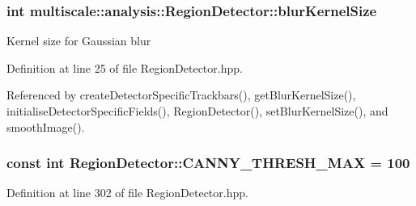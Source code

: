 \hypertarget{classmultiscale_1_1analysis_1_1RegionDetector_aae6ee0ec7f0a610dd8a906c1eb181bc7}{
\subsubsection[{blur\-Kernel\-Size}]{\setlength{\rightskip}{0pt plus 5cm}int {\bf multiscale\-::analysis\-::\-Region\-Detector\-::blur\-Kernel\-Size}}}\label{classmultiscale_1_1analysis_1_1RegionDetector_aae6ee0ec7f0a610dd8a906c1eb181bc7}
\-Kernel size for \-Gaussian blur 

\-Definition at line 25 of file \-Region\-Detector.\-hpp.



\-Referenced by create\-Detector\-Specific\-Trackbars(), get\-Blur\-Kernel\-Size(), initialise\-Detector\-Specific\-Fields(), \-Region\-Detector(), set\-Blur\-Kernel\-Size(), and smooth\-Image().

\hypertarget{classmultiscale_1_1analysis_1_1RegionDetector_ad6590f4617a6b3d34c6032f8febd7beb}{
\subsubsection[{\-C\-A\-N\-N\-Y\-\_\-\-T\-H\-R\-E\-S\-H\-\_\-\-M\-A\-X}]{\setlength{\rightskip}{0pt plus 5cm}const int {\bf \-Region\-Detector\-::\-C\-A\-N\-N\-Y\-\_\-\-T\-H\-R\-E\-S\-H\-\_\-\-M\-A\-X} = 100}}\label{classmultiscale_1_1analysis_1_1RegionDetector_ad6590f4617a6b3d34c6032f8febd7beb}


\-Definition at line 302 of file \-Region\-Detector.\-hpp.


